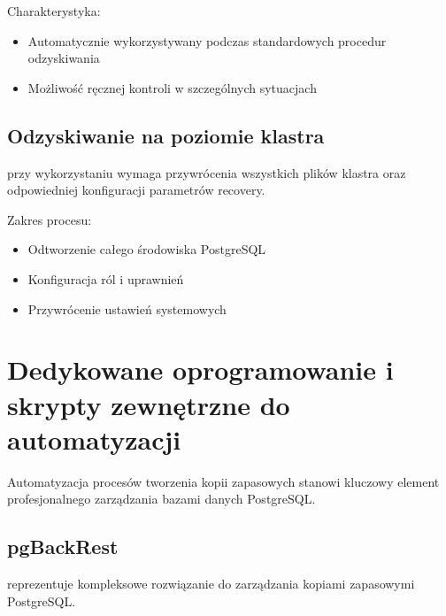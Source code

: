 \documentclass[letterpaper,10pt,polish]{sphinxmanual}
\begin{document}
\sphinxAtStartPar
Charakterystyka:
\begin{itemize}
\item {} 
\sphinxAtStartPar
Automatycznie wykorzystywany podczas standardowych procedur odzyskiwania

\item {} 
\sphinxAtStartPar
Możliwość ręcznej kontroli w szczególnych sytuacjach

\end{itemize}


\subsection{Odzyskiwanie na poziomie klastra}
\label{\detokenize{kopie_zapasowe_i_odzyskiwanie_danych:odzyskiwanie-na-poziomie-klastra}}
\sphinxAtStartPar
{} przy wykorzystaniu  wymaga przywrócenia wszystkich plików klastra oraz odpowiedniej konfiguracji parametrów recovery.

\sphinxAtStartPar
Zakres procesu:
\begin{itemize}
\item {} 
\sphinxAtStartPar
Odtworzenie całego środowiska PostgreSQL

\item {} 
\sphinxAtStartPar
Konfiguracja ról i uprawnień

\item {} 
\sphinxAtStartPar
Przywrócenie ustawień systemowych

\end{itemize}


\section{Dedykowane oprogramowanie i skrypty zewnętrzne do automatyzacji}
\label{\detokenize{kopie_zapasowe_i_odzyskiwanie_danych:dedykowane-oprogramowanie-i-skrypty-zewnetrzne-do-automatyzacji}}
\sphinxAtStartPar
Automatyzacja procesów tworzenia kopii zapasowych stanowi kluczowy element profesjonalnego zarządzania bazami danych PostgreSQL.


\subsection{pgBackRest}
\label{\detokenize{kopie_zapasowe_i_odzyskiwanie_danych:pgbackrest}}
\sphinxAtStartPar
{} reprezentuje kompleksowe rozwiązanie do zarządzania kopiami zapasowymi PostgreSQL.
\end{document}
